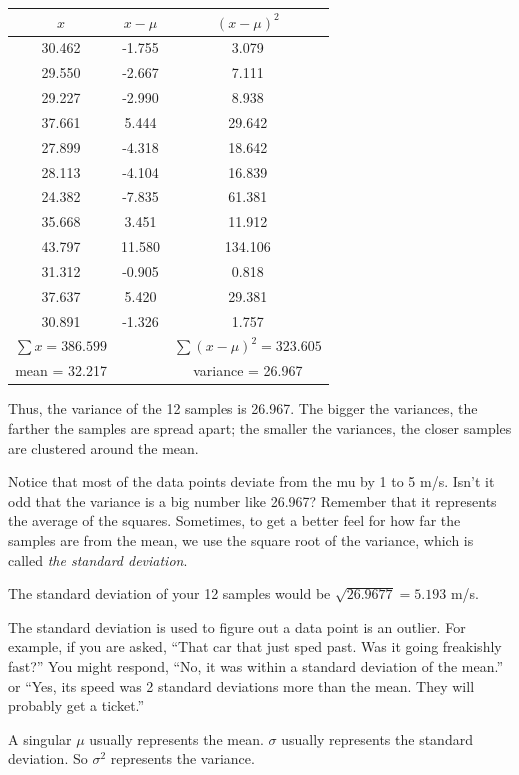 \begin{tabular} {c | c | c}

  $x$ & $x - \mu$ & $(x - \mu)^2$\\
  \hline
30.462 & -1.755 & 3.079 \\
29.550 & -2.667 & 7.111\\
29.227 & -2.990 & 8.938\\
37.661 & 5.444 & 29.642\\
27.899 & -4.318 & 18.642\\
28.113 & -4.104 & 16.839 \\
24.382 & -7.835 & 61.381 \\
35.668 & 3.451 & 11.912 \\
43.797 & 11.580 & 134.106\\
31.312 & -0.905 & 0.818\\
37.637 & 5.420 & 29.381\\
30.891 & -1.326 & 1.757\\
\hline
$\sum x = 386.599$ & & $\sum (x - \mu)^2 = 323.605$\\
mean = 32.217 & & variance = 26.967
\end{tabular}

Thus, the variance of the 12 samples is 26.967. The bigger the variances, 
the farther the samples are spread apart; the smaller the variances, the closer
samples are clustered around the mean.

Notice that most of the data points deviate from the mu by 1 to 5
m/s. Isn't it odd that the variance is a big number like 26.967?
Remember that it represents the average of the squares. Sometimes, to
get a better feel for how far the samples are from the mean, we use
the square root of the variance, which is called \textit{the standard
  deviation}.

The standard deviation of your 12 samples would be $\sqrt{26.9677} =
  5.193$ m/s.

The standard deviation is used to figure out a data point is an
outlier. For example, if you are asked, ``That car that just sped
past. Was it going freakishly fast?'' You might respond, ``No, it was
within a standard deviation of the mean.'' or ``Yes, its speed was 2
standard deviations more than the mean. They will probably get a ticket.''

A singular $\mu$ usually represents the mean. $\sigma$ usually represents
the standard deviation. So $\sigma^2$ represents the variance.

